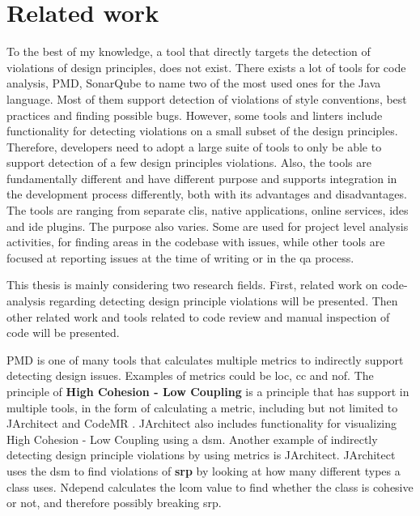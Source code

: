 \documentclass{report}
\begin{document}
\chapter{Related work}
\label{relatedwork}

To the best of my knowledge, a tool that directly targets the detection of violations of design principles, does not exist. There exists a lot of tools for code analysis, PMD\cite{pmd}, SonarQube\cite{sonarqube} to name two of the most used ones for the Java language. Most of them support detection of violations of style conventions, best practices and finding possible bugs. However, some tools and linters include functionality for detecting violations on a small subset of the design principles. Therefore, developers need to adopt a large suite of tools to only be able to support detection of a few design principles violations. Also, the tools are fundamentally different and have different purpose and supports integration in the development process differently, both with its advantages and disadvantages. The tools are ranging from separate \gls{cli}s, native applications, online services, \gls{ide}s and \gls{ide} plugins. The purpose also varies. Some are used for project level analysis activities, for finding areas in the codebase with issues, while other tools are focused at reporting issues at the time of writing or in the \gls{qa} process. 

This thesis is mainly considering two research fields. First, related work on code-analysis regarding detecting design principle violations will be presented. Then other related work and tools related to code review and manual inspection of code will be presented.

PMD \cite{pmd} is one of many tools that calculates multiple metrics to indirectly support detecting design issues. Examples of metrics could be \gls{loc}, \gls{cc} and \gls{nof}. The principle of \textbf{High Cohesion - Low Coupling} is a principle that has support in multiple tools, in the form of calculating a metric, including but not limited to JArchitect \cite{jarchitect} and CodeMR \cite{codemr}. JArchitect \cite{jarchitect} also includes functionality for visualizing  High Cohesion - Low Coupling using a \gls{dsm}. Another example of indirectly detecting design principle violations by using metrics is JArchitect. JArchitect uses the \gls{dsm} to find violations of \textbf{\gls{srp}} by looking at how many different types a class uses. Ndepend \cite{ndepend} calculates the \gls{lcom} value to find whether the class is cohesive or not, and therefore possibly breaking \gls{srp}. 
\end{document}
